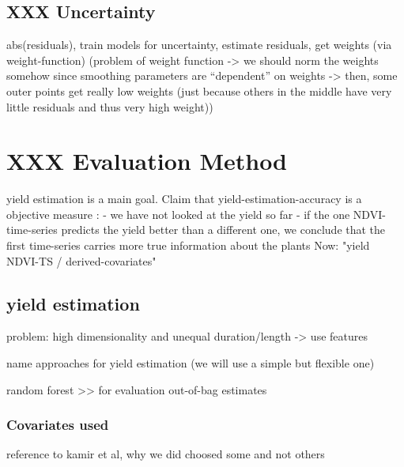 {{    }
    
    \subsection{XXX Uncertainty}
    abs(residuals), train models for uncertainty, estimate residuals, get weights (via weight-function)  (problem of weight function -> we should norm the weights somehow since smoothing parameters are ``dependent'' on weights -> then, some outer points get really low weights (just because others in the middle have very little residuals and thus very high weight))
    
}



\section{XXX Evaluation Method}{
    {
        yield estimation is a main goal. 
        Claim that yield-estimation-accuracy is a objective measure :
            - we have not looked at the yield so far 
            - if the one NDVI-time-series predicts the yield better than a different one, we conclude that the first time-series carries more true information about the plants
        Now: "yield ~ NDVI-TS / derived-covariates" 
    }
    
    \subsection{yield estimation}{
        problem: high dimensionality and unequal duration/length -> use features
        
        name approaches for yield estimation (we will use a simple but flexible one)
        
        random forest >> for evaluation out-of-bag estimates
    }
    \subsubsection{Covariates used}{
        reference to kamir et al, why we did choosed some and not others
    }
    
}



